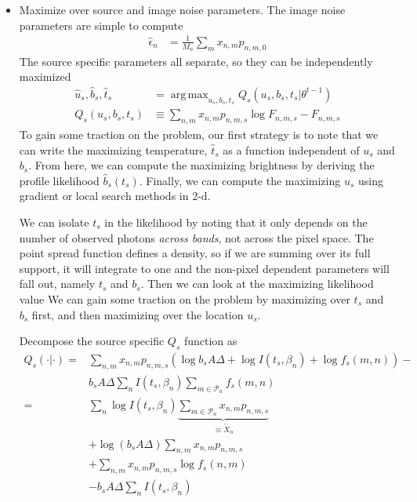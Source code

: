 \documentclass[11pt]{article}
\DeclareMathOperator*{\argmax}{arg\,max}
\begin{document}
\begin{itemize}
\item Maximize over source and image noise parameters.  The image noise parameters are simple to compute
\begin{align}
  \hat \epsilon_n &= \frac{1}{M_n} \sum_{m} x_{n,m} p_{n,m,0}
\end{align}
The source specific parameters all separate, so they can be independently maximized
\begin{align}
  \hat u_s, \hat b_s, \hat t_s &= \argmax_{u_s, b_s, t_s} Q_s(u_s, b_s, t_s | \theta^{t-1}) \\
  Q_s(u_s, b_s, t_s) &\equiv \sum_{n,m} x_{n,m} p_{n,m,s} \log F_{n,m,s} - F_{n,m,s}
\end{align}
To gain some traction on the problem, our first strategy is to note that we can write the maximizing temperature, $\hat t_s$ as a function independent of $u_s$ and $b_s$.  From here, we can compute the maximizing brightness by deriving the profile likelihood $\hat b_s(t_s)$.  Finally, we can compute the maximizing $u_s$ using gradient or local search methods in 2-d.  

We can isolate $t_s$ in the likelihood by noting that it only depends on the number of observed photons \emph{across bands}, not across the pixel space. The point spread function defines a density, so if we are summing over its full support, it will integrate to one and the non-pixel dependent parameters will fall out, namely $t_s$ and $b_s$.  Then we can look at the maximizing likelihood value We can gain some traction on the problem by maximizing over $t_s$ and $b_s$ first, and then maximizing over the location $u_s$.  

Decompose the source specific $Q_s$ function as 
\begin{align*}
Q_s(\cdot | \cdot) 
  =& \sum_{n,m} x_{n,m} p_{n,m,s} \left(\log b_s A \Delta + \log I(t_s, \beta_n) + \log f_s(m,n) \right) - \\
   & b_s A \Delta \sum_{n} I(t_s, \beta_n) \sum_{m \in \mathcal{P}_n} f_s(m,n) \\
  =& \sum_{n} \log I(t_s, \beta_n) \underbrace{\sum_{m \in \mathcal{P}_n} x_{n,m} p_{n,m,s}}_{\equiv \tilde X_n} \\
   & + \log (b_s A \Delta) \sum_{n,m} x_{n,m} p_{n,m,s} \\
   & + \sum_{n,m} x_{n,m} p_{n,m,s} \log f_s(n,m) \\
   & - b_s A \Delta \sum_{n} I(t_s, \beta_n) 
\end{align*}


\end{itemize}
\end{document}
